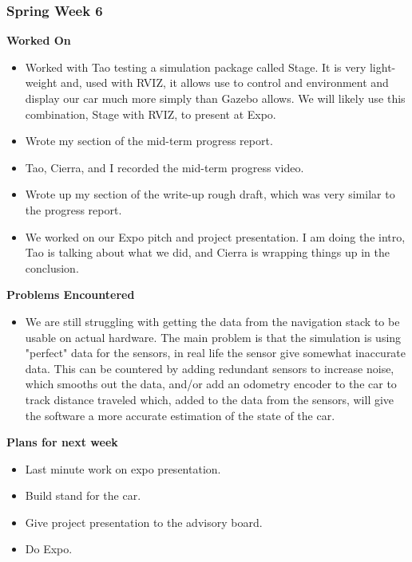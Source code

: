 \documentclass[compsoc,draftclsnofoot,onecolumn,10pt]{IEEEtran}
\begin{document}
\subsubsection*{Spring Week 6}
\textbf{Worked On}
\begin{itemize}
    \item Worked with Tao testing a simulation package called Stage. It is very light-weight and, used with RVIZ, it allows use to control and environment and display our car much more simply than Gazebo allows. We will likely use this combination, Stage with RVIZ, to present at Expo.
    \item Wrote my section of the mid-term progress report.
    \item Tao, Cierra, and I recorded the mid-term progress video.
    \item Wrote up my section of the write-up rough draft, which was very similar to the progress report.
    \item We worked on our Expo pitch and project presentation. I am doing the intro, Tao is talking about what we did, and Cierra is wrapping things up in the conclusion.
\end{itemize}

\textbf{Problems Encountered}
\begin{itemize}
    \item We are still struggling with getting the data from the navigation stack to be usable on actual hardware. The main problem is that the simulation is using "perfect" data for the sensors, in real life the sensor give somewhat inaccurate data. This can be countered by adding redundant sensors to increase noise, which smooths out the data, and/or add an odometry encoder to the car to track distance traveled which, added to the data from the sensors, will give the software a more accurate estimation of the state of the car.
\end{itemize}

\textbf{Plans for next week}
\begin{itemize}
    \item Last minute work on expo presentation.
    \item Build stand for the car.
    \item Give project presentation to the advisory board.
    \item Do Expo.
\end{itemize}
\end{document}
